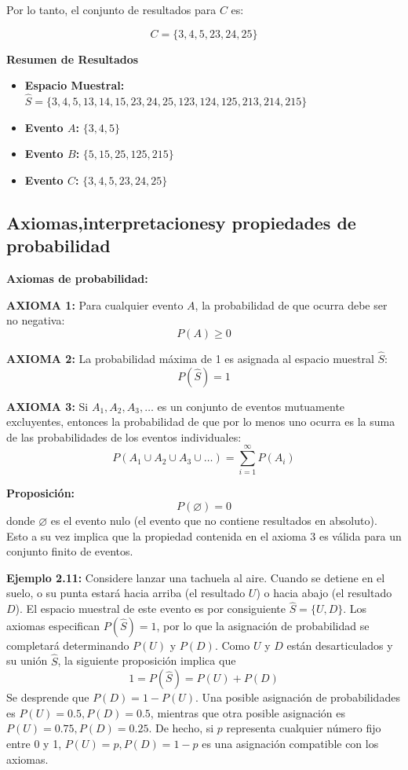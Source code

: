 \documentclass[a4paper]{article}
\begin{document}
Por lo tanto, el conjunto de resultados para $C$ es:

$$ C = \{3, 4, 5, 23, 24, 25\} $$

\vspace{0.5cm}

\textbf{Resumen de Resultados}

\begin{itemize}
    \item \textbf{Espacio Muestral:} $\hat{S} = \{3, 4, 5, 13, 14, 15, 23, 24, 25, 123, 124, 125, 213, 214, 215\}$
    \item \textbf{Evento $A$:} $\{3, 4, 5\}$
    \item \textbf{Evento $B$:} $\{5, 15, 25, 125, 215\}$
    \item \textbf{Evento $C$:} $\{3, 4, 5, 23, 24, 25\}$
\end{itemize}



\subsection{Axiomas,interpretacionesy propiedades de probabilidad}


\textbf{Axiomas de probabilidad:}

\textbf{AXIOMA 1:}
Para cualquier evento $A$, la probabilidad de que ocurra debe ser no negativa:
$$ P(A) \ge 0 $$

\textbf{AXIOMA 2:}
La probabilidad máxima de 1 es asignada al espacio muestral $\hat{S}$:
$$ P(\hat{S}) = 1 $$

\textbf{AXIOMA 3:}
Si $A_1, A_2, A_3, \dots$ es un conjunto de eventos mutuamente excluyentes, entonces la probabilidad de que por lo menos uno ocurra es la suma de las probabilidades de los eventos individuales:
$$ P(A_1 \cup A_2 \cup A_3 \cup \dots) = \sum_{i=1}^{\infty} P(A_i) $$

\textbf{Proposición:}
$$ P(\varnothing) = 0 $$
donde $\varnothing$ es el evento nulo (el evento que no contiene resultados en absoluto). Esto a su vez implica que la propiedad contenida en el axioma 3 es válida para un conjunto finito de eventos.

\textbf{Ejemplo 2.11:}
Considere lanzar una tachuela al aire. Cuando se detiene en el suelo, o su punta estará hacia arriba (el resultado $U$) o hacia abajo (el resultado $D$). El espacio muestral de este evento es por consiguiente $\hat{S} = \{U, D\}$. Los axiomas especifican $P(\hat{S}) = 1$, por lo que la asignación de probabilidad se completará determinando $P(U)$ y $P(D)$. Como $U$ y $D$ están desarticulados y su unión $\hat{S}$, la siguiente proposición implica que
$$ 1 = P(\hat{S}) = P(U) + P(D) $$
Se desprende que $P(D) = 1 - P(U)$. Una posible asignación de probabilidades es $P(U) = 0.5, P(D) = 0.5$, mientras que otra posible asignación es $P(U) = 0.75, P(D) = 0.25$. De hecho, si $p$ representa cualquier número fijo entre 0 y 1, $P(U) = p, P(D) = 1 - p$ es una asignación compatible con los axiomas. 
\end{document}
